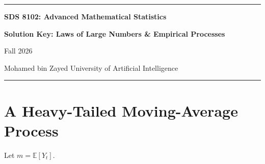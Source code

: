 \documentclass[11pt]{article}
\newcommand{\bbE}{\mathbb{E}}
\begin{document}
\begin{center}
{\color{MBZBlue}\rule{\textwidth}{1.2pt}}

\vspace{0.6em}
{\LARGE\bfseries\color{MBZBlue}SDS 8102: Advanced Mathematical Statistics}

\vspace{0.5em}
{\Large\bfseries\color{MBZTeal}Solution Key: Laws of Large Numbers \& Empirical Processes}

\vspace{0.4em}
{\large Fall 2026}

\vspace{0.2em}
{\large Mohamed bin Zayed University of Artificial Intelligence}

\vspace{0.6em}
{\color{MBZBlue}\rule{\textwidth}{1.2pt}}
\end{center}

\section{A Heavy-Tailed Moving-Average Process}

Let $m=\bbE[Y_t]$.
\end{document}
